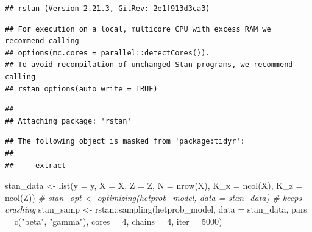 \documentclass[
]{book}
\newenvironment{Shaded}{\begin{snugshade}}{\end{snugshade}}
\newcommand{\AttributeTok}[1]{\textcolor[rgb]{0.77,0.63,0.00}{#1}}
\newcommand{\CommentTok}[1]{\textcolor[rgb]{0.56,0.35,0.01}{\textit{#1}}}
\newcommand{\DecValTok}[1]{\textcolor[rgb]{0.00,0.00,0.81}{#1}}
\newcommand{\FunctionTok}[1]{\textcolor[rgb]{0.00,0.00,0.00}{#1}}
\newcommand{\NormalTok}[1]{#1}
\newcommand{\OtherTok}[1]{\textcolor[rgb]{0.56,0.35,0.01}{#1}}
\newcommand{\SpecialCharTok}[1]{\textcolor[rgb]{0.00,0.00,0.00}{#1}}
\newcommand{\StringTok}[1]{\textcolor[rgb]{0.31,0.60,0.02}{#1}}
\begin{document}
\begin{verbatim}
## rstan (Version 2.21.3, GitRev: 2e1f913d3ca3)
\end{verbatim}

\begin{verbatim}
## For execution on a local, multicore CPU with excess RAM we recommend calling
## options(mc.cores = parallel::detectCores()).
## To avoid recompilation of unchanged Stan programs, we recommend calling
## rstan_options(auto_write = TRUE)
\end{verbatim}

\begin{verbatim}
## 
## Attaching package: 'rstan'
\end{verbatim}

\begin{verbatim}
## The following object is masked from 'package:tidyr':
## 
##     extract
\end{verbatim}

\begin{Shaded}
\begin{Highlighting}[]
\NormalTok{stan\_data }\OtherTok{\textless{}{-}} \FunctionTok{list}\NormalTok{(}\AttributeTok{y =}\NormalTok{ y, }\AttributeTok{X =}\NormalTok{ X, }\AttributeTok{Z =}\NormalTok{ Z,}
                  \AttributeTok{N =} \FunctionTok{nrow}\NormalTok{(X), }\AttributeTok{K\_x =} \FunctionTok{ncol}\NormalTok{(X), }\AttributeTok{K\_z =} \FunctionTok{ncol}\NormalTok{(Z))}
\CommentTok{\# stan\_opt \textless{}{-} optimizing(hetprob\_model, data = stan\_data)  \# keeps crashing}
\NormalTok{stan\_samp }\OtherTok{\textless{}{-}}\NormalTok{ rstan}\SpecialCharTok{::}\FunctionTok{sampling}\NormalTok{(hetprob\_model, }\AttributeTok{data =}\NormalTok{ stan\_data,}
                            \AttributeTok{pars =} \FunctionTok{c}\NormalTok{(}\StringTok{"beta"}\NormalTok{, }\StringTok{"gamma"}\NormalTok{),}
                            \AttributeTok{cores =} \DecValTok{4}\NormalTok{,}
                            \AttributeTok{chains =} \DecValTok{4}\NormalTok{,}
                            \AttributeTok{iter =} \DecValTok{5000}\NormalTok{)}
\end{Highlighting}
\end{Shaded}
\end{document}
